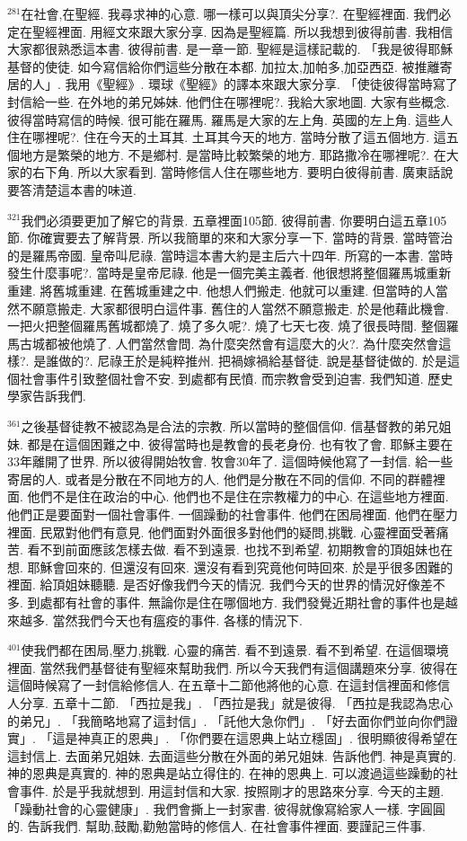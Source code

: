 \documentclass{book}
\begin{document}
$^{281}$在社會,在聖經.
我尋求神的心意.
哪一樣可以與頂尖分享?.
在聖經裡面.
我們必定在聖經裡面.
用經文來跟大家分享.
因為是聖經篇.
所以我想到彼得前書.
我相信大家都很熟悉這本書.
彼得前書.
是一章一節.
聖經是這樣記載的.
「我是彼得耶穌基督的使徒.
如今寫信給你們這些分散在本都.
加拉太,加帕多,加亞西亞.
被推離寄居的人」.
我用《聖經》.
環球《聖經》的譯本來跟大家分享.
「使徒彼得當時寫了封信給一些.
在外地的弟兄姊妹.
他們住在哪裡呢?.
我給大家地圖.
大家有些概念.
彼得當時寫信的時候.
很可能在羅馬.
羅馬是大家的左上角.
英國的左上角.
這些人住在哪裡呢?.
住在今天的土耳其.
土耳其今天的地方.
當時分散了這五個地方.
這五個地方是繁榮的地方.
不是鄉村.
是當時比較繁榮的地方.
耶路撒冷在哪裡呢?.
在大家的右下角.
所以大家看到.
當時修信人住在哪些地方.
要明白彼得前書.
廣東話說要答清楚這本書的味道.

$^{321}$我們必須要更加了解它的背景.
五章裡面105節.
彼得前書.
你要明白這五章105節.
你確實要去了解背景.
所以我簡單的來和大家分享一下.
當時的背景.
當時管治的是羅馬帝國.
皇帝叫尼祿.
當時這本書大約是主后六十四年.
所寫的一本書.
當時發生什麼事呢?.
當時是皇帝尼祿.
他是一個完美主義者.
他很想將整個羅馬城重新重建.
將舊城重建.
在舊城重建之中.
他想人們搬走.
他就可以重建.
但當時的人當然不願意搬走.
大家都很明白這件事.
舊住的人當然不願意搬走.
於是他藉此機會.
一把火把整個羅馬舊城都燒了.
燒了多久呢?.
燒了七天七夜.
燒了很長時間.
整個羅馬古城都被他燒了.
人們當然會問.
為什麼突然會有這麼大的火?.
為什麼突然會這樣?.
是誰做的?.
尼祿王於是純粹推州.
把禍嫁禍給基督徒.
說是基督徒做的.
於是這個社會事件引致整個社會不安.
到處都有民憤.
而宗教會受到迫害.
我們知道.
歷史學家告訴我們.

$^{361}$之後基督徒教不被認為是合法的宗教.
所以當時的整個信仰.
信基督教的弟兄姐妹.
都是在這個困難之中.
彼得當時也是教會的長老身份.
也有牧了會.
耶穌主要在33年離開了世界.
所以彼得開始牧會.
牧會30年了.
這個時候他寫了一封信.
給一些寄居的人.
或者是分散在不同地方的人.
他們是分散在不同的信仰.
不同的群體裡面.
他們不是住在政治的中心.
他們也不是住在宗教權力的中心.
在這些地方裡面.
他們正是要面對一個社會事件.
一個躁動的社會事件.
他們在困局裡面.
他們在壓力裡面.
民眾對他們有意見.
他們面對外面很多對他們的疑問,挑戰.
心靈裡面受著痛苦.
看不到前面應該怎樣去做.
看不到遠景.
也找不到希望.
初期教會的頂姐妹也在想.
耶穌會回來的.
但還沒有回來.
還沒有看到究竟他何時回來.
於是乎很多困難的裡面.
給頂姐妹聽聽.
是否好像我們今天的情況.
我們今天的世界的情況好像差不多.
到處都有社會的事件.
無論你是住在哪個地方.
我們發覺近期社會的事件也是越來越多.
當然我們今天也有瘟疫的事件.
各樣的情況下.

$^{401}$使我們都在困局,壓力,挑戰.
心靈的痛苦.
看不到遠景.
看不到希望.
在這個環境裡面.
當然我們基督徒有聖經來幫助我們.
所以今天我們有這個講題來分享.
彼得在這個時候寫了一封信給修信人.
在五章十二節他將他的心意.
在這封信裡面和修信人分享.
五章十二節.
「西拉是我」.
「西拉是我」就是彼得.
「西拉是我認為忠心的弟兄」.
「我簡略地寫了這封信」.
「託他大急你們」.
「好去面你們並向你們證實」.
「這是神真正的恩典」.
「你們要在這恩典上站立穩固」.
很明顯彼得希望在這封信上.
去面弟兄姐妹.
去面這些分散在外面的弟兄姐妹.
告訴他們.
神是真實的.
神的恩典是真實的.
神的恩典是站立得住的.
在神的恩典上.
可以渡過這些躁動的社會事件.
於是乎我就想到.
用這封信和大家.
按照剛才的思路來分享.
今天的主題.
「躁動社會的心靈健康」.
我們會撕上一封家書.
彼得就像寫給家人一樣.
字圓圓的.
告訴我們.
幫助,鼓勵,勸勉當時的修信人.
在社會事件裡面.
要謹記三件事.
\end{document}
